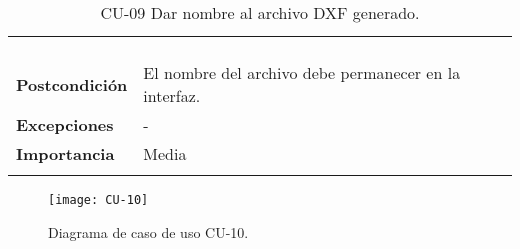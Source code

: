 \begin{longtable}[H]{@{}ll@{}}
\begin{minipage}[t]{0.71\columnwidth}
\begin{enumerate}
\end{enumerate}\strut
\end{minipage}\tabularnewline
\begin{minipage}[t]{0.23\columnwidth}\raggedright\strut
\textbf{Postcondición}\strut
\end{minipage} & \begin{minipage}[t]{0.71\columnwidth}\raggedright\strut
El nombre del archivo debe permanecer en la interfaz.
\end{minipage}\tabularnewline
\begin{minipage}[t]{0.23\columnwidth}\raggedright\strut
\textbf{Excepciones}\strut
\end{minipage} & \begin{minipage}[t]{0.71\columnwidth}\raggedright\strut
-\strut
\end{minipage}\tabularnewline
\begin{minipage}[t]{0.23\columnwidth}\raggedright\strut
\textbf{Importancia}\strut
\end{minipage} & \begin{minipage}[t]{0.71\columnwidth}\raggedright\strut
Media\strut
\end{minipage}\tabularnewline
\bottomrule
\caption{CU-09 Dar nombre al archivo DXF generado.}
\end{longtable}

\newpage

\begin{figure}[H]
	\centering
	\texttt{[image: CU-10]}
	\caption{Diagrama de caso de uso CU-10.}
	\label{fig:CU-10}
\end{figure}


